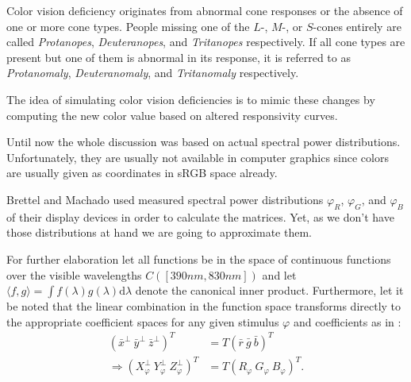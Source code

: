 \documentclass{sig-alternate-05-2015}
\newcommand{\dlambda}{\mathrm{d}\lambda}
\begin{document}
Color vision deficiency originates from abnormal cone responses or the absence of one or more cone types.
People missing one of the $L$-, $M$-, or $S$-cones entirely are called \emph{Protanopes}, \emph{Deuteranopes}, and \emph{Tritanopes} respectively.
If all cone types are present but one of them is abnormal in its response, it is referred to as \emph{Protanomaly}, \emph{Deuteranomaly}, and \emph{Tritanomaly} respectively.

The idea of simulating color vision deficiencies is to mimic these changes by computing the new color value based on altered responsivity curves.

Until now the whole discussion was based on actual spectral power distributions.
Unfortunately, they are usually not available in computer graphics since colors are usually given as coordinates in sRGB space already.

Brettel and Machado used measured spectral power distributions $\varphi_R$, $\varphi_G$, and $\varphi_B$ of their display devices in order to calculate the matrices.
Yet, as we don't have those distributions at hand we are going to approximate them.

For further elaboration let all functions be in the space of continuous functions over the visible wavelengths $C([390nm, 830nm])$ and let $\langle f, g \rangle = \int f(\lambda) g(\lambda) \dlambda$ denote the canonical inner product.
Furthermore, let it be noted that the linear combination in the function space transforms directly to the appropriate coefficient spaces for any given stimulus $\varphi$ and coefficients as in :
\begin{eqnarray}
    \left( \bar x^\perp\ \bar y^\perp\ \bar z^\perp \right)^T
    & =
    T
    \left( \bar r\ \bar g\ \bar b \right)^T \\
    \label{eqn:coeff}
    \Rightarrow
    \left( X_\varphi^\perp\ Y_\varphi^\perp\ Z_\varphi^\perp \right)^T
    & =
    T
    \left( R_\varphi\ G_\varphi\ B_\varphi \right)^T.
\end{eqnarray}
\end{document}
